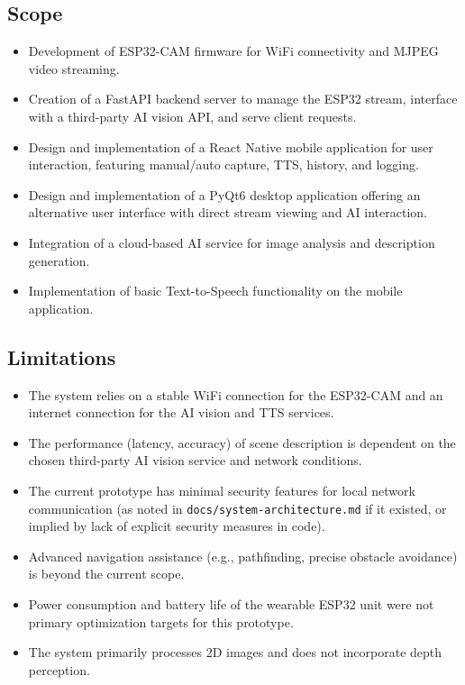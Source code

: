 \documentclass[12pt, a4paper]{report}
\begin{document}
\subsection*{Scope}
\begin{itemize}
    \item Development of ESP32-CAM firmware for WiFi connectivity and MJPEG video streaming.
    \item Creation of a FastAPI backend server to manage the ESP32 stream, interface with a third-party AI vision API, and serve client requests.
    \item Design and implementation of a React Native mobile application for user interaction, featuring manual/auto capture, TTS, history, and logging.
    \item Design and implementation of a PyQt6 desktop application offering an alternative user interface with direct stream viewing and AI interaction.
    \item Integration of a cloud-based AI service for image analysis and description generation.
    \item Implementation of basic Text-to-Speech functionality on the mobile application.
\end{itemize}

\subsection*{Limitations}
\begin{itemize}
    \item The system relies on a stable WiFi connection for the ESP32-CAM and an internet connection for the AI vision and TTS services.
    \item The performance (latency, accuracy) of scene description is dependent on the chosen third-party AI vision service and network conditions.
    \item The current prototype has minimal security features for local network communication (as noted in \texttt{docs/system-architecture.md} if it existed, or implied by lack of explicit security measures in code).
    \item Advanced navigation assistance (e.g., pathfinding, precise obstacle avoidance) is beyond the current scope.
    \item Power consumption and battery life of the wearable ESP32 unit were not primary optimization targets for this prototype.
    \item The system primarily processes 2D images and does not incorporate depth perception.
\end{itemize}
\end{document}
